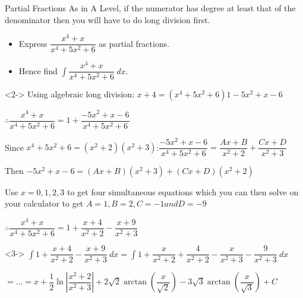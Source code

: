 \documentclass[8pt]{beamer}
\begin{document}
	
	\begin{frame}[shrink]{Partial Fractions}
		\alert{As in A Level, if the numerator has degree at least that of the denominator then you will have to do long division first.}
		
		\begin{problem}
			\begin{itemize}
				\item Express $\dfrac{x^{4}+x}{x^{4}+5x^{2}+6}$ as partial fractions.
				\item Hence find $\int \dfrac{x^{4}+x}{x^{4}+5x^{2}+6}\ dx.$
			\end{itemize}
		\end{problem}
		
		\begin{solution}<2->
			Using algebraic long division: $x+4 = (x^{4}+5x^{2}+6)1 -5x^{2}+x-6$
			
			$\therefore \dfrac{x^{4}+x}{x^{4}+5x^{2}+6}=1+\dfrac{-5x^{2}+x-6}{x^{4}+5x^{2}+6}$
			
			Since $x^{4}+5x^{2}+6 = (x^{2}+2)(x^{2}+3)$:$\dfrac{-5x^{2}+x-6}{x^{4}+5x^{2}+6} = \dfrac{Ax+B}{x^{2}+2}+\dfrac{Cx+D}{x^{2}+3}$
			
			Then $-5x^{2}+x-6 = (Ax+B)(x^{2}+3)+(Cx+D)(x^{2}+2)$
			
			Use $x=0,1,2,3$ to get four simultaneous equations which you can then solve on your calculator to get $A=1, B=2, C=-1 and D=-9$
			
			$\therefore \dfrac{x^{4}+x}{x^{4}+5x^{2}+6} = 1+\dfrac{x+4}{x^{2}+2}-\dfrac{x+9}{x^{2}+3}$
		\end{solution}
		
		\begin{solution}<3->
			$\int 1+\dfrac{x+4}{x^{2}+2}-\dfrac{x+9}{x^{2}+3}\ dx= \int 1+\dfrac{x}{x^{2}+2}+\dfrac{4}{x^{2}+2}-\dfrac{x}{x^{2}+3}-\dfrac{9}{x^{2}+3}\ dx$
			
			$=\ldots =x+\dfrac{1}{2}\ln \left| \dfrac{x^{2}+2}{x^{2}+3}\right| +2\sqrt{2}\arctan \left( \dfrac{x}{\sqrt{2}}\right) -3\sqrt{3}\arctan \left( \dfrac{x}{\sqrt{3}}\right) +C $
		\end{solution}
	\end{frame}
	
\end{document}
